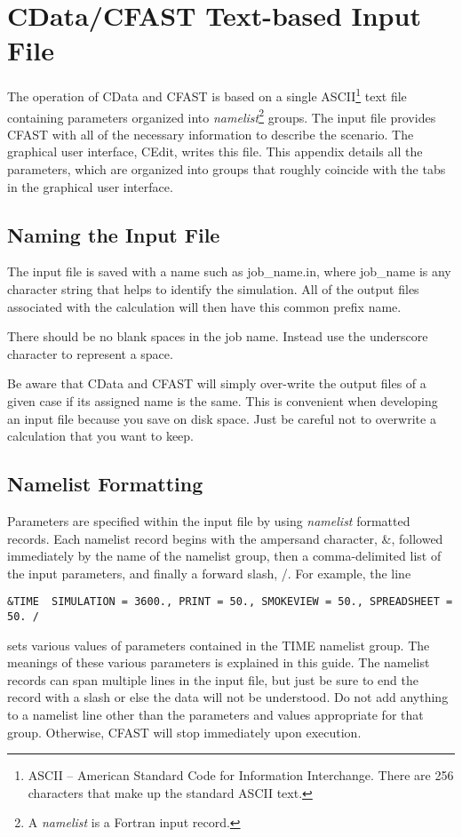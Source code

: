 \chapter{CData/CFAST Text-based Input File}
\label{preprocessor_reference}

The operation of CData and CFAST is based on a single ASCII\footnote{ASCII -- American Standard Code for Information Interchange. There are 256 characters that make up the standard ASCII text.} text file containing parameters organized into {\em namelist}\footnote{A {\em namelist} is a Fortran input record.} groups.
The input file provides CFAST  with all of the necessary information to describe the scenario. The graphical user interface, CEdit, writes this file. This appendix details all the parameters, which are organized into groups that roughly coincide with the tabs in the graphical user interface.

\section{Naming the Input File}

The input file is saved with a name such as {\ct job\_name.in}, where {\ct job\_name} is any character string that helps to identify the simulation. All of the output files associated with the calculation will then have this common prefix name.

There should be no blank spaces in the job name. Instead use the underscore character to represent a space.

Be aware that CData and CFAST will simply over-write the output files of a given case if its assigned name is the same. This is convenient when developing an input file because you save on disk space. Just be careful not to overwrite a calculation that you want to keep.

\section{Namelist Formatting}

Parameters are specified within the input file by using {\em namelist} formatted records. Each namelist record begins with the ampersand character, {\ct \&}, followed immediately by the name of the namelist group, then a comma-delimited list of the input parameters, and finally a forward slash, {\ct /}. For example, the line
\begin{lstlisting}
&TIME  SIMULATION = 3600., PRINT = 50., SMOKEVIEW = 50., SPREADSHEET = 50. /
\end{lstlisting}
sets various values of parameters contained in the {\ct TIME} namelist group. The meanings of these various parameters is explained in this guide. The namelist records can span multiple lines in the input file, but just be sure to end the record with a slash or else the data will not be understood. Do not add anything to a namelist line other than the parameters and values appropriate for that group. Otherwise, CFAST will stop immediately upon execution.

